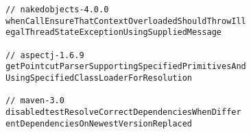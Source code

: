 \begin{verbatim}
// nakedobjects-4.0.0
whenCallEnsureThatContextOverloadedShouldThrowIll
egalThreadStateExceptionUsingSuppliedMessage 

// aspectj-1.6.9
getPointcutParserSupportingSpecifiedPrimitivesAnd
UsingSpecifiedClassLoaderForResolution 

// maven-3.0
disabledtestResolveCorrectDependenciesWhenDiffer
entDependenciesOnNewestVersionReplaced 
\end{verbatim}




